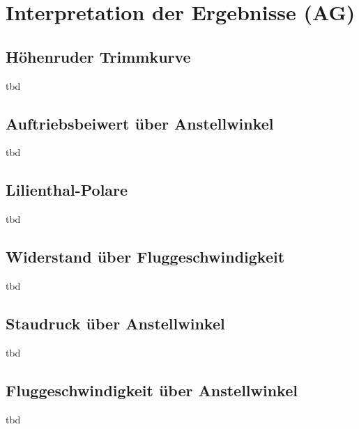 \chapter{Interpretation der Ergebnisse (AG)}

\section{Höhenruder Trimmkurve}
tbd

\section{Auftriebsbeiwert über Anstellwinkel}
tbd

\section{Lilienthal-Polare}
tbd

\section{Widerstand über Fluggeschwindigkeit}
tbd

\section{Staudruck über Anstellwinkel}
tbd

\section{Fluggeschwindigkeit über Anstellwinkel}
tbd